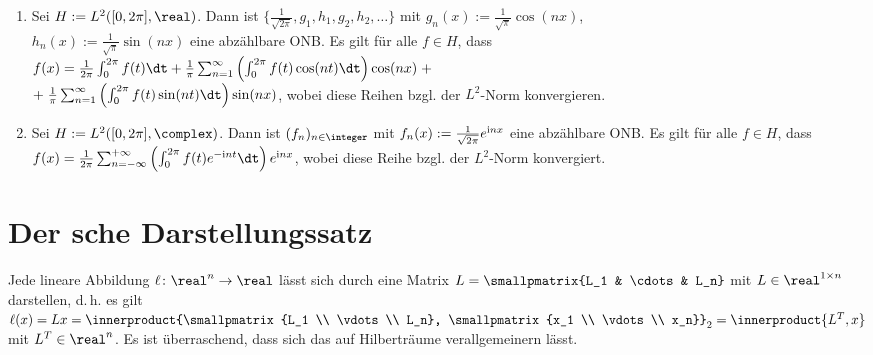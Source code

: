 \begin{Bsp}
    \begin{enumerate}[label=\emph{(\alph*)}]
        \item
        Sei $H := L^2([0, 2\pi], \real)$.
        Dann ist $\{\frac{1}{\sqrt{2\pi}}, g_1, h_1, g_2, h_2, \dotsc\}$
        mit $g_n(x) := \frac{1}{\sqrt{\pi}} \cos(nx)$,\\
        $h_n(x) := \frac{1}{\sqrt{\pi}} \sin(nx)$
        eine abzählbare ONB.
        Es gilt für alle $f \in H$, dass\\
        $f(x) = \frac{1}{2\pi} \int_0^{2\pi} f(t)\dt +
        \frac{1}{\pi} \sum_{n=1}^\infty \left(\int_0^{2\pi} f(t)\cos(nt)\dt\right) \cos(nx) \;+$\\
        $+\; \frac{1}{\pi} \sum_{n=1}^\infty \left(\int_0^{2\pi} f(t)\sin(nt)\dt\right) \sin(nx)$,
        wobei diese Reihen bzgl. der $L^2$-Norm konvergieren.

        \item
        Sei $H := L^2([0, 2\pi], \complex)$.
        Dann ist $(f_n)_{n \in \integer}$ mit $f_n(x) := \frac{1}{\sqrt{2\pi}} e^{\mathrm{i} nx}$
        eine abzählbare ONB.
        Es gilt für alle $f \in H$, dass
        $f(x) = \frac{1}{2\pi} \sum_{n=-\infty}^{+\infty}
        \left(\int_0^{2\pi} f(t) e^{-\iu nt} \dt\right) e^{\iu nx}$,
        wobei diese Reihe bzgl. der $L^2$-Norm konvergiert.
    \end{enumerate}
\end{Bsp}

\pagebreak

\section{%
    Der sche Darstellungssatz%
}

\begin{Bem}
    Jede lineare Abbildung $\ell\colon \real^n \rightarrow \real$ lässt sich durch eine
    Matrix $L = \smallpmatrix{L_1 & \cdots & L_n}$ mit $L \in \real^{1 \times n}$ darstellen,
    d.\,h. es gilt $\ell(x) = Lx = \innerproduct{\smallpmatrix{L_1 \\ \vdots \\ L_n},
    \smallpmatrix{x_1 \\ \vdots \\ x_n}}_2 = \innerproduct{L^T, x}$ mit $L^T \in \real^n$.
    Es ist überraschend, dass sich das auf Hilberträume verallgemeinern lässt.
\end{Bem}

